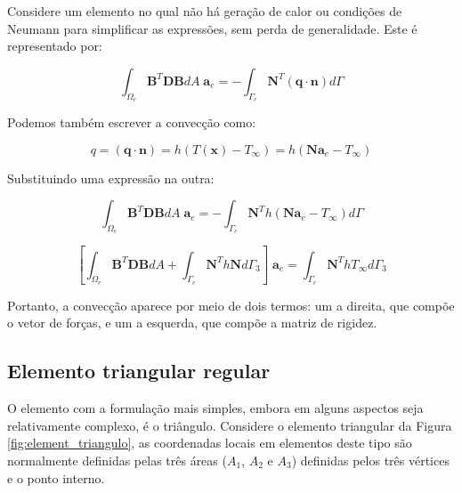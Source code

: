         Considere um elemento no qual não há geração de calor ou condições de Neumann para simplificar as expressões, sem perda de generalidade. Este é representado por:

        \begin{equation}
            \int_{\Omega_e} \mathbf{B}^T \mathbf{D} \mathbf{B} dA \; \mathbf{a}_e = 
            -\int_{\Gamma_e} \mathbf{N}^T \left(\mathbf{q} \cdot \mathbf{n}\right) d\Gamma
        \end{equation}

        Podemos também escrever a convecção como:

        \begin{equation}
            q = \left(\mathbf{q} \cdot \mathbf{n}\right) = h\left(T(\mathbf{x}) - T_\infty\right) = h \left(\mathbf{N} \mathbf{a}_e - T_\infty\right)
        \end{equation}

        Substituindo uma expressão na outra:

        \begin{equation}
            \int_{\Omega_e} \mathbf{B}^T \mathbf{D} \mathbf{B} dA \; \mathbf{a}_e = 
            -\int_{\Gamma_e} \mathbf{N}^T h \left(\mathbf{N} \mathbf{a}_e - T_\infty\right) d\Gamma
        \end{equation}

        \begin{equation}
            \left[\int_{\Omega_e} \mathbf{B}^T \mathbf{D} \mathbf{B} dA +  \int_{\Gamma_e} \mathbf{N}^T  h \mathbf{N} d\Gamma_3\right] \; \mathbf{a}_e = 
            \int_{\Gamma_e} \mathbf{N}^T  h T_\infty  d\Gamma_3
        \end{equation}

        Portanto, a convecção aparece por meio de dois termos: um a direita, que compõe o vetor de forças, e um a esquerda, que compõe a matriz de rigidez.


    \subsection{Elemento triangular regular}
    \label{sec:elemento_triangular}

        O elemento com a formulação mais simples, embora em alguns aspectos seja relativamente complexo, é o triângulo. Considere o elemento triangular da Figura \ref{fig:element_triangulo}, as coordenadas locais em elementos deste tipo são normalmente definidas pelas três áreas ($A_1$, $A_2$ e $A_3$) definidas pelos três vértices e o ponto interno.

